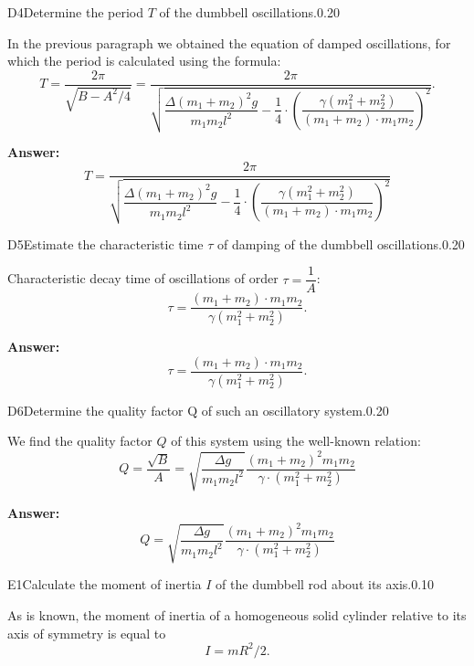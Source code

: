 \documentclass[11pt,a4paper]{article}
\begin{document}
\begin{solcard}{D4}{Determine the period $T$ of the dumbbell oscillations.}{0.20}

In the previous paragraph we obtained the equation of damped oscillations, for which the period is calculated using the formula: $$T = \dfrac{2\pi}{\sqrt{B - A^2/4}} = \dfrac{2 \pi}{\sqrt{ \dfrac{\Delta (m_1+m_2)^2 g}{m_1 m_2 l^2} - \dfrac{1}{4}\cdot \left( \dfrac{\gamma (m_1^2+m_2^2)}{(m_1+m_2) \cdot m_1 m_2} \right) ^2}}.$$

\par\smallskip\noindent\textbf{Answer:} $$T = \dfrac{2 \pi}{\sqrt{ \dfrac{\Delta (m_1+m_2)^2 g}{m_1 m_2 l^2} - \dfrac{1}{4}\cdot \left( \dfrac{\gamma (m_1^2+m_2^2)}{(m_1+m_2) \cdot m_1 m_2} \right) ^2}}$$
\end{solcard}

\begin{solcard}{D5}{Estimate the characteristic time $\tau$ of damping of the dumbbell oscillations.}{0.20}

Characteristic decay time of oscillations of order $\tau = \dfrac{1}{A}$: $$\tau =  \dfrac{(m_1+m_2) \cdot m_1 m_2}{\gamma \left( m_1^2+m_2^2 \right) }.$$

\par\smallskip\noindent\textbf{Answer:} $$\tau =  \dfrac{(m_1+m_2) \cdot m_1 m_2}{\gamma (m_1^2+m_2^2)}.$$
\end{solcard}

\begin{solcard}{D6}{Determine the quality factor $\mathrm{Q}$ of such an oscillatory system.}{0.20}

We find the quality factor $Q$ of this system using the well-known relation: $$Q = \dfrac{\sqrt{B}}{A} = \sqrt{\dfrac{\Delta g}{m_1 m_2 l^2}}\dfrac{(m_1+m_2)^2 m_1 m_2}{\gamma \cdot \left( m_1^2+m_2^2 \right) }$$

\par\smallskip\noindent\textbf{Answer:} $$Q = \sqrt{\dfrac{\Delta g}{m_1 m_2 l^2}}\dfrac{(m_1+m_2)^2 m_1 m_2}{\gamma \cdot \left( m_1^2+m_2^2 \right) }$$
\end{solcard}

\begin{solcard}{E1}{Calculate the moment of inertia $I$ of the dumbbell rod about its axis.}{0.10}

As is known, the moment of inertia of a homogeneous solid cylinder relative to its axis of symmetry is equal to \begin{equation} I = mR^2/2. \end{equation}

\end{solcard}
\end{document}
